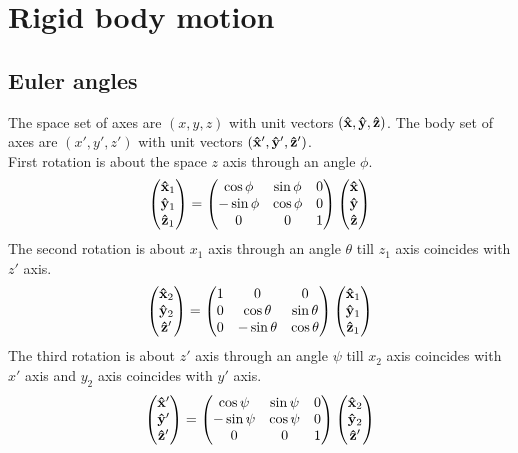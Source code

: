 \documentclass[12pt]{article}
\begin{document}
\section*{Rigid body motion}
\subsection*{Euler angles}
The space set of axes are $(x,y,z)$ with unit vectors $(\vu{x},\vu{y},\vu{z})$. The body set of axes are $(x',y',z')$ with unit vectors $(\vu{x}',\vu{y}',\vu{z}')$.\\
First rotation is about the space $z$ axis through an angle $\phi$.
\[
\begin{pmatrix}
\vu{x}_1\\ \vu{y}_1\\ \vu{z}_1
\end{pmatrix}
=
\begin{pmatrix}
\cos\phi& \sin\phi& 0\\
-\sin\phi& \cos\phi& 0\\
0& 0& 1
\end{pmatrix}
\begin{pmatrix}
\vu{x}\\ \vu{y}\\ \vu{z}
\end{pmatrix}
\]
The second rotation is about $x_1$ axis through an angle $\theta$ till $z_1$ axis coincides with $z'$ axis.
\[
\begin{pmatrix}
\vu{x}_2\\ \vu{y}_2\\ \vu{z}'
\end{pmatrix}
=
\begin{pmatrix}
1& 0& 0 \\
0& \cos\theta& \sin\theta\\
0& -\sin\theta& \cos\theta
\end{pmatrix}
\begin{pmatrix}
\vu{x}_1\\ \vu{y}_1\\ \vu{z}_1
\end{pmatrix}
\]
The third rotation is about $z'$ axis through an angle $\psi$ till $x_2$ axis coincides with $x'$ axis and $y_2$ axis coincides with $y'$ axis.
\[
\begin{pmatrix}
\vu{x}'\\ \vu{y}'\\ \vu{z}'
\end{pmatrix}
=
\begin{pmatrix}
\cos\psi& \sin\psi& 0 \\
-\sin\psi& \cos\psi& 0 \\
0& 0& 1
\end{pmatrix}
\begin{pmatrix}
\vu{x}_2\\ \vu{y}_2\\ \vu{z}'
\end{pmatrix}
\]
\end{document}
